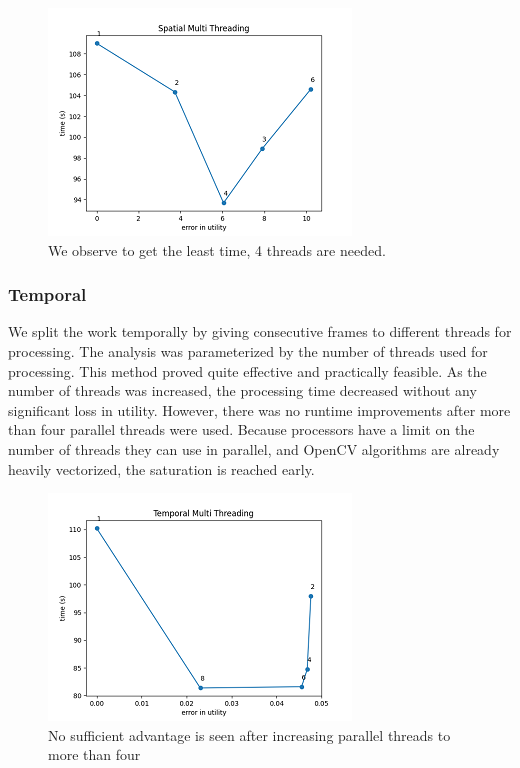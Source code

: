 \documentclass[conference]{IEEEtran}
\begin{document}
\begin{figure}[htbp]
\centerline{\includegraphics{plots/plot_split_frame.png}}
\caption{We observe to get the least time, 4 threads are needed.}
\label{smt_evt} 
\end{figure}


\subsubsection{Temporal}
We split the work temporally by giving consecutive frames to different threads for processing. The analysis was parameterized by the number of threads used for processing. This method proved quite effective and practically feasible. As the number of threads was increased, the processing time decreased without any significant loss in utility.
However, there was no runtime improvements after more than four parallel threads were used. Because processors have a limit on the number of threads they can use in parallel, and OpenCV algorithms are already heavily vectorized, the saturation is reached early.

\begin{figure}[htbp]
\centerline{\includegraphics{plots/plot_split_video.png}}
\caption{No sufficient advantage is seen after increasing parallel threads to more than four}
\label{tmt_pvt} 
\end{figure}
\end{document}

